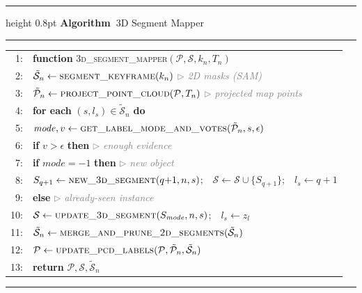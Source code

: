 \begin{algorithm}[h!]
  \label{alg:segment_mapper}%
  \hrule height 0.8pt\vspace{3pt}
  \noindent\textbf{Algorithm~\thealgorithm}\quad 3D Segment Mapper\par
  \vspace{2pt}\hrule\vspace{3pt}
  \newcommand{\fn}[1]{\textsc{#1}}
  \newcommand{\I}[1]{\hspace*{#1.4em}}
  \newcommand{\cm}[1]{\quad\textcolor{gray}{$\triangleright$ \textit{#1}}}
  {\small
  \begin{tabular}{@{}r@{\;\;}l@{}}
     1: & \textbf{function} \fn{3d\_segment\_mapper}$(\mathcal{P}, \mathcal{S}, k_n, T_n)$ \\
     2: & \I1$\tilde{\mathcal{S}}_n \gets \fn{segment\_keyframe}(k_n)$ \cm{2D masks (SAM)} \\
     3: & \I1$\tilde{\mathcal{P}}_n \gets \fn{project\_point\_cloud}(\mathcal{P}, T_n)$ \cm{projected map points} \\
     4: & \I1\textbf{for each} $(s, l_s) \in \tilde{\mathcal{S}}_n$ \textbf{do} \\
     5: & \I2$\mathit{mode}, v \gets \fn{get\_label\_mode\_and\_votes}(\tilde{\mathcal{P}}_n, s, \epsilon)$ \\
     6: & \I2\textbf{if} $v > \epsilon$ \textbf{then} \cm{enough evidence} \\
     7: & \I3\textbf{if} $\mathit{mode} = -1$ \textbf{then} \cm{new object} \\
     8: & \I4$S_{q+1} \gets \fn{new\_3d\_segment}(q{+}1, n, s)$;\ \ $\mathcal{S} \gets \mathcal{S} \cup \{S_{q+1}\}$;\ \ $l_s \gets q{+}1$ \\
     9: & \I3\textbf{else} \cm{already-seen instance} \\
    10: & \I4$\mathcal{S} \gets \fn{update\_3d\_segment}(S_{\mathit{mode}}, n, s)$;\ \ $l_s \gets z_l$ \\
    11: & \I1$\tilde{\mathcal{S}}_n \gets \fn{merge\_and\_prune\_2d\_segments}(\tilde{\mathcal{S}}_n)$ \\
    12: & \I1$\mathcal{P} \gets \fn{update\_pcd\_labels}(\mathcal{P}, \tilde{\mathcal{P}}_n, \tilde{\mathcal{S}}_n)$ \\
    13: & \I1\textbf{return} $\mathcal{P}, \mathcal{S}, \tilde{\mathcal{S}}_n$ \\
  \end{tabular}}
  \vspace{-2pt}\hrule
\end{algorithm}

